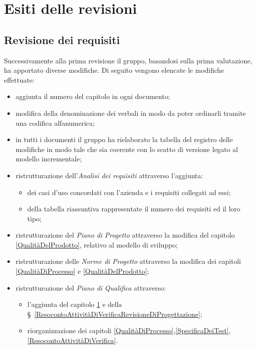 \chapter{Esiti delle revisioni}\label{EsitiDelleRevisioni}

\section{Revisione dei requisiti}\label{EsitiDelleRevisioniRevisioneDeiRequisiti}

Successivamente alla prima revisione il gruppo, basandosi sulla prima valutazione, ha apportato diverse modifiche. Di seguito vengono elencate le modifiche effettuate:
\begin{itemize}
	\item aggiunta il numero del capitolo in ogni documento;
	\item modifica della denominazione dei verbali in modo da poter ordinarli tramite una codifica alfanumerica; 
	\item in tutti i documenti il gruppo ha rielaborato la tabella del registro delle modifiche in modo tale che sia coerente con lo scatto di versione legato al modello incrementale;
	\item ristrutturazione dell'\textit{Analisi dei requisiti} attraverso l'aggiunta: 
	\begin{itemize}
		\item dei casi d'uso concordati con l'azienda e i requisiti collegati ad essi;
		\item della tabella riassuntiva rappresentate il numero dei requisiti ed il loro tipo;
	\end{itemize}
	\item ristrutturazione del \textit{Piano di Progetto} attraverso la modifica del capitolo \ref{QualitàDelProdotto}, relativo al modello di sviluppo;
	\item ristrutturazione delle \textit{Norme di Progetto} attraverso la modifica dei capitoli \ref{QualitàDiProcesso} e \ref{QualitàDelProdotto};
	\item ristrutturazione del \textit{Piano di Qualifica} attraverso:
	\begin{itemize}
		\item l'aggiunta del capitolo \ref{EsitiDelleRevisioni} e della \S~\ref{ResocontoAttivitàDiVerificaRevisioneDiProgettazione};
		\item riorganizzazione dei capitoli \ref{QualitàDiProcesso},\ref{SpecificaDeiTest},\ref{ResocontoAttivitàDiVerifica}.
	\end{itemize}
\end{itemize}

